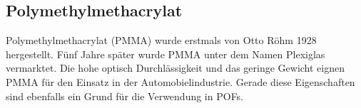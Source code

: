 \subsection{Polymethylmethacrylat}
\label{subsec:pofpmma}

Polymethylmethacrylat (PMMA) wurde erstmals von Otto Röhm 1928 hergestellt. Fünf
Jahre später wurde PMMA unter dem Namen
Plexiglas\textsuperscript{\textregistered} vermarktet. Die hohe optisch
Durchlässigkeit und das geringe Gewicht eignen PMMA für den Einsatz in der
Automobielindustrie. Gerade diese Eigenschaften sind ebenfalls ein Grund für die
Verwendung in POFs. \cite{pofwuppmma}



